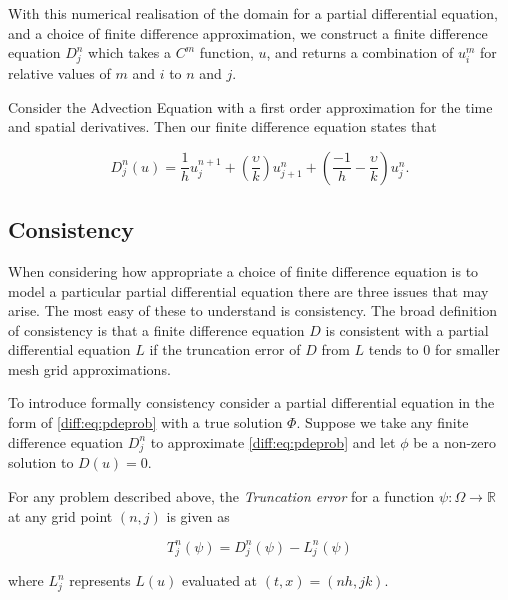 \documentclass[../main.tex]{subfiles}
\begin{document}
  With this numerical realisation of the domain for a partial differential equation, and a choice of finite difference approximation, we construct a finite difference equation $D^n_j$ which takes a $C^m$ function, $u$, and returns a combination of $u^m_i$ for relative values of $m$ and $i$ to $n$ and $j$.

  \begin{example}
    Consider the Advection Equation with a first order approximation for the time and spatial derivatives. Then our finite difference equation states that

    \begin{equation} \label{diff:eq:advectionexample}
      D^n_j(u) = \frac{1}{h} u^{n+1}_j + \left( \frac{\upsilon}{k} \right) u^n_{j+1} + \left( \frac{-1}{h} - \frac{\upsilon}{k} \right) u^n_j.
    \end{equation}
  \end{example}

  \subsection{Consistency} \label{diff:sec:consistency}
  When considering how appropriate a choice of finite difference equation is to model a particular partial differential equation there are three issues that may arise. The most easy of these to understand is consistency. The broad definition of consistency is that a finite difference equation $D$ is consistent with a partial differential equation $L$ if the truncation error of $D$ from $L$ tends to $0$ for smaller mesh grid approximations.

  To introduce formally consistency consider a partial differential equation in the form of \autoref{diff:eq:pdeprob} with a true solution $\Phi$. Suppose we take any finite difference equation $D^n_j$ to approximate \autoref{diff:eq:pdeprob} and let $\phi$ be a non-zero solution to $D(u) = 0$.

  \begin{definition}
    For any problem described above, the \emph{Truncation error} for a function $\psi : \Omega \to \mathbb{R}$ at any grid point $(n, j)$ is given as

    \begin{equation}
      T^n_j(\psi) = D^n_j(\psi) - L^n_j(\psi)
    \end{equation}

    where $L^n_j$ represents $L(u)$ evaluated at $(t, x) = (n h, j k)$.
  \end{definition}
\end{document}
